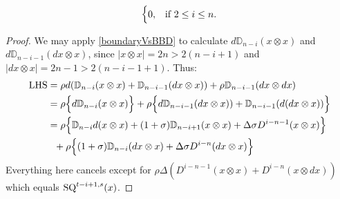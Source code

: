 \documentclass[10pt]{article}
\newcommand{\twist}{\sigma}
\begin{document}
\begin{AdamsSSEQ operations final}
\begin{cor}
\[\begin{cases}
0,&\textup{if }2\leq i\leq n.
\end{cases}\]
\end{cor}
\begin{proof}
We may apply \ref{boundaryVsBBD} to calculate $d\mathbb{D}_{n-i}(x\otimes x)$ and $d\mathbb{D}_{n-i-1}(dx\otimes x)$, since $|x\otimes x|=2n> 2(n-i+1)$ and $|dx\otimes x|=2n-1> 2(n-i-1+1)$. Thus:
\begin{alignat*}{2}
\textup{LHS}
&=
\rho d(\mathbb{D}_{n-i}(x\otimes x)+\mathbb{D}_{n-i-1}(dx\otimes x))+\rho\mathbb{D}_{n-i-1}(dx\otimes dx)%
\\
&=
\rho\Bigl\{d\mathbb{D}_{n-i}(x\otimes x)\Bigr\}+\rho\Bigl\{d\mathbb{D}_{n-i-1}(dx\otimes x))+\mathbb{D}_{n-i-1}(d(dx\otimes x))\Bigr\}%
\\
&=
\rho\Bigl\{\mathbb{D}_{n-i}d(x\otimes x)+(1+\twist)\mathbb{D}_{n-i+1}(x\otimes x)+\Delta\sigma D^{i-n-1}(x\otimes x)\Bigr\}
\\
&\ \ +\rho\Bigl\{(1+\twist)\mathbb{D}_{n-i}(dx\otimes x)+\Delta\sigma D^{i-n}(dx\otimes x)\Bigr\}
\end{alignat*}
Everything here cancels except for $\rho\Delta(D^{i-n-1}(x\otimes x)+D^{i-n}(x\otimes dx))$ which equals $\textup{SQ}^{t-i+1,s}(x)$.
\end{proof}



\end{AdamsSSEQ operations final}
\end{document}

